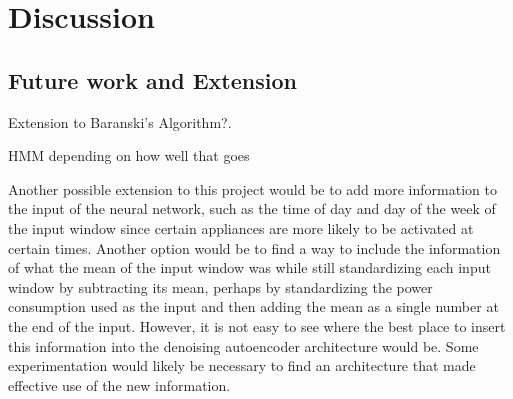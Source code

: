 \documentclass{article}
\begin{document}
\section{Discussion}

\subsection{Future work and Extension}

Extension to Baranski's Algorithm?.

HMM depending on how well that goes

Another possible extension to this project would be to add more information to the input of the neural network, such as the time of day and day of the week of the input window since certain appliances are more likely to be activated at certain times. Another option would be to find a way to include the information of what the mean of the input window was while still standardizing each input window by subtracting its mean\cite{Kelly}, perhaps by standardizing the power consumption used as the input and then adding the mean as a single number at the end of the input. However, it is not easy to see where the best place to insert this information into the denoising autoencoder architecture would be. Some experimentation would likely be necessary to find an architecture that made effective use of the new information.




\end{document}
